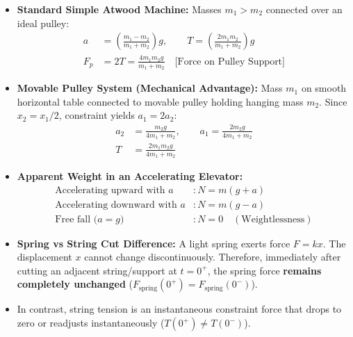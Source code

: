 \documentclass[10pt,twoside,openright]{book}
\begin{document}
\begin{usecasebox}
\begin{itemize}
  \item \textbf{Standard Simple Atwood Machine:} Masses $m_1 > m_2$ connected over an ideal pulley:
  \begin{align}
    a &= \left(\frac{m_1 - m_2}{m_1 + m_2}\right)g, \qquad T = \left(\frac{2m_1 m_2}{m_1 + m_2}\right)g \\
    F_p &= 2T = \frac{4m_1 m_2 g}{m_1 + m_2} \quad \text{[Force on Pulley Support]}
  \end{align}
  \item \textbf{Movable Pulley System (Mechanical Advantage):} Mass $m_1$ on smooth horizontal table connected to movable pulley holding hanging mass $m_2$. Since $x_2 = x_1/2$, constraint yields $a_1 = 2a_2$:
  \begin{align}
    a_2 &= \frac{m_2 g}{4m_1 + m_2}, \qquad a_1 = \frac{2m_2 g}{4m_1 + m_2} \\
    T &= \frac{2m_1 m_2 g}{4m_1 + m_2}
  \end{align}
  \item \textbf{Apparent Weight in an Accelerating Elevator:}
  \begin{align}
    \text{Accelerating upward with } a &: N = m(g + a) \\
    \text{Accelerating downward with } a &: N = m(g - a) \\
    \text{Free fall ($a = g$)} &: N = 0 \quad (\text{Weightlessness})
  \end{align}
\end{itemize}
\end{usecasebox}

\begin{trapbox}
\begin{itemize}
  \item \textbf{Spring vs String Cut Difference:} A light spring exerts force $F = kx$. The displacement $x$ cannot change discontinuously. Therefore, immediately after cutting an adjacent string/support at $t = 0^+$, the spring force \textbf{remains completely unchanged} ($F_{\text{spring}}(0^+) = F_{\text{spring}}(0^-)$).
  \item In contrast, string tension is an instantaneous constraint force that drops to zero or readjusts instantaneously ($T(0^+) \neq T(0^-)$).
\end{itemize}
\end{trapbox}
\end{document}

